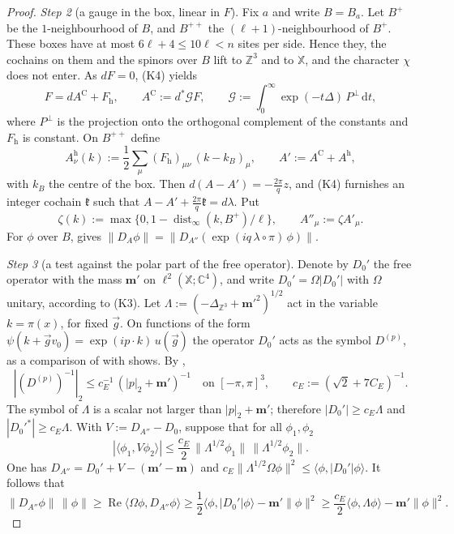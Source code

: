 \documentclass[11pt]{amsart}
\theoremstyle{definition}
\begin{document}
\begin{proof}
\emph{Step 2} (a gauge in the box, linear in $F$).
Fix $a$ and write $B=B_a$.
Let $B^+$ be the $1$-neighbourhood of $B$, and $B^{++}$ the $(\ell+1)$-neighbourhood of $B^+$.
These boxes have at most $6\ell+4\le10\ell<n$ sites per side.
Hence they, the cochains on them and the spinors over $B$ lift to $\mathbb Z^3$ and to $\mathbb X$, and the character $\chi$ does not enter.
As $dF=0$, (K4) yields
\begin{equation*}
F=dA^{\mathrm C}+F_{\mathrm h},\qquad A^{\mathrm C}:=d^*\mathcal GF,\qquad\mathcal G:=\int_0^\infty\exp(-t\Delta)\,P^\perp\,\mathrm dt,
\end{equation*}
where $P^\perp$ is the projection onto the orthogonal complement of the constants and $F_{\mathrm h}$ is constant.
On $B^{++}$ define
\begin{equation*}
A^{\mathrm h}_\nu(k):=\frac12\sum_\mu(F_{\mathrm h})_{\mu\nu}\,(k-k_B)_\mu,\qquad A':=A^{\mathrm C}+A^{\mathrm h},
\end{equation*}
with $k_B$ the centre of the box.
Then $d(A-A')=-\frac{2\pi}{q}z$, and (K4) furnishes an integer cochain $\mathfrak k$ such that $A-A'+\frac{2\pi}{q}\mathfrak k=d\lambda$.
Put
\begin{equation*}
\zeta(k):=\max\{0,1-\operatorname{dist}_\infty(k,B^+)/\ell\},\qquad A''_\mu:=\zeta A'_\mu.
\end{equation*}
For $\phi$ over $B$, \cite[Proposition~3.16\,(a)]{QEDII} gives $\|D_A\phi\|=\|D_{A''}(\exp(iq\,\lambda\circ\pi)\,\phi)\|$.

\emph{Step 3} (a test against the polar part of the free operator).
Denote by $D_0'$ the free operator with the mass $\mathbf m'$ on $\ell^2(\mathbb X;\mathbb C^4)$, and write $D_0'=\Omega|D_0'|$ with $\Omega$ unitary, according to (K3).
Let $\Lambda:=(-\Delta_{\mathbb Z^3}+\mathbf m'^2)^{1/2}$ act in the variable $k=\pi(x)$, for fixed $\vec g$.
On functions of the form $\psi(k+\vec gv_0)=\exp(ip\cdot k)\,u(\vec g)$ the operator $D_0'$ acts as the symbol $D^{(p)}$, as a comparison of \cite[Proposition~3.18\,(a)]{QEDII} with \cite[Proposition~37.1\,(a)]{QEDIII} shows.
By \cite[Proposition~37.1\,(f)]{QEDIII},
\begin{equation*}
|(D^{(p)})^{-1}|_2\le c_E^{-1}\,(|p|_2+\mathbf m')^{-1}\quad\text{on }[-\pi,\pi]^3,\qquad c_E:=(\sqrt2+7C_E)^{-1}.
\end{equation*}
The symbol of $\Lambda$ is a scalar not larger than $|p|_2+\mathbf m'$; therefore $|D_0'|\ge c_E\Lambda$ and $|D_0'^*|\ge c_E\Lambda$.
With $V:=D_{A''}-D_0$, suppose that for all $\phi_1,\phi_2$
\begin{equation}
\tag{5.1}\label{eq:polar-form-bound}
|\langle\phi_1,V\phi_2\rangle|\le\frac{c_E}{2}\,\|\Lambda^{1/2}\phi_1\|\,\|\Lambda^{1/2}\phi_2\|.
\end{equation}
One has $D_{A''}=D_0'+V-(\mathbf m'-\mathbf m)$ and $c_E\|\Lambda^{1/2}\Omega\phi\|^2\le\langle\phi,|D_0'|\phi\rangle$.
It follows that
\begin{equation*}
\|D_{A''}\phi\|\,\|\phi\|\ge\operatorname{Re}\langle\Omega\phi,D_{A''}\phi\rangle\ge\frac12\langle\phi,|D_0'|\phi\rangle-\mathbf m'\|\phi\|^2\ge\frac{c_E}{2}\langle\phi,\Lambda\phi\rangle-\mathbf m'\|\phi\|^2.
\end{equation*}


\end{proof}
\end{document}
